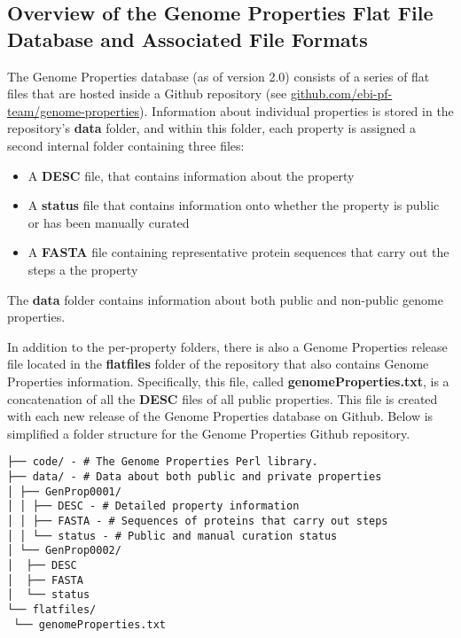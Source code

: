\subsection{Overview of the Genome Properties Flat File Database and Associated File Formats} \label{Genome-Properties-Files} \label{genome-properties-files}

The Genome Properties database (as of version 2.0) consists of a series of flat files that are hosted inside a Github repository (see \href{github.com/ebi-pf-team/genome-properties}{github.com/ebi-pf-team/genome-properties}). Information about individual properties is stored in the repository's \textbf{data} folder, and within this folder, each property is assigned a second internal folder containing three files: 
\begin{itemize}
\item A \textbf{DESC} file, that contains information about the property
\item A \textbf{status} file that contains information onto whether the property is public or has been manually curated
\item A \textbf{FASTA} \cite{pearson19905} file containing representative protein sequences that carry out the steps a the property
\end{itemize}
The \textbf{data} folder contains information about both public and non-public genome properties. 

In addition to the per-property folders, there is also a Genome Properties release file located in the \textbf{flatfiles} folder of the repository that also contains Genome Properties information. Specifically, this file, called \textbf{genomeProperties.txt}, is a concatenation of all the \textbf{DESC} files of all public properties. This file is created with each new release of the Genome Properties database on Github. Below is simplified a folder structure for the Genome Properties Github repository.

\begin{verbatim}
├── code/ - # The Genome Properties Perl library.
├── data/ - # Data about both public and private properties
│ ├── GenProp0001/
│ │ ├── DESC - # Detailed property information
│ │ ├── FASTA - # Sequences of proteins that carry out steps
│ │ └── status - # Public and manual curation status
│ └── GenProp0002/
│  ├── DESC
│  ├── FASTA
│  └── status
└── flatfiles/
 └── genomeProperties.txt
\end{verbatim}

